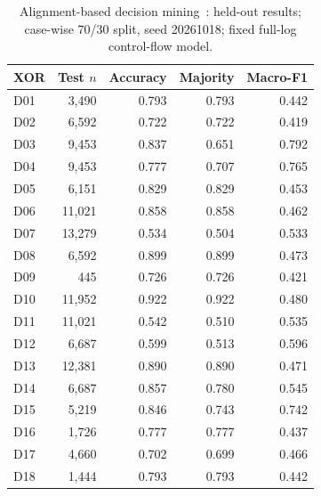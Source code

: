 \begin{table}[t]
\centering
\caption{Alignment-based decision mining~\cite{deleoni2013dataaware}: held-out results; case-wise 70/30 split, seed 20261018; fixed full-log control-flow model.}
\label{tab:decision-mining}
\begin{tabular}{lrrrr}
\hline
XOR & Test $n$ & Accuracy & Majority & Macro-F1 \\
\hline
D01 & 3,490 & 0.793 & 0.793 & 0.442 \\
D02 & 6,592 & 0.722 & 0.722 & 0.419 \\
D03 & 9,453 & 0.837 & 0.651 & 0.792 \\
D04 & 9,453 & 0.777 & 0.707 & 0.765 \\
D05 & 6,151 & 0.829 & 0.829 & 0.453 \\
D06 & 11,021 & 0.858 & 0.858 & 0.462 \\
D07 & 13,279 & 0.534 & 0.504 & 0.533 \\
D08 & 6,592 & 0.899 & 0.899 & 0.473 \\
D09 & 445 & 0.726 & 0.726 & 0.421 \\
D10 & 11,952 & 0.922 & 0.922 & 0.480 \\
D11 & 11,021 & 0.542 & 0.510 & 0.535 \\
D12 & 6,687 & 0.599 & 0.513 & 0.596 \\
D13 & 12,381 & 0.890 & 0.890 & 0.471 \\
D14 & 6,687 & 0.857 & 0.780 & 0.545 \\
D15 & 5,219 & 0.846 & 0.743 & 0.742 \\
D16 & 1,726 & 0.777 & 0.777 & 0.437 \\
D17 & 4,660 & 0.702 & 0.699 & 0.466 \\
D18 & 1,444 & 0.793 & 0.793 & 0.442 \\
\hline
\end{tabular}
\end{table}
